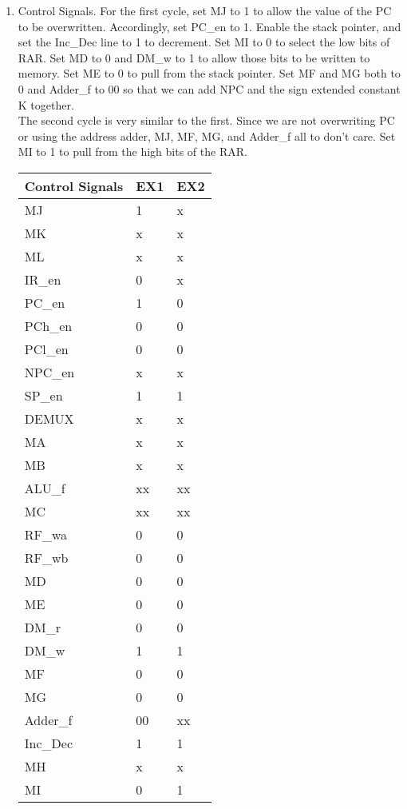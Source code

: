 \documentclass[12pt,letterpaper]{article}
\begin{document}
\begin{enumerate}
\begin{enumerate}
        \item Control Signals. For the first cycle, set MJ to 1 to allow the value of the PC to be overwritten. Accordingly, set PC\_en to 1. Enable the stack pointer, and set the Inc\_Dec line to 1 to decrement. Set MI to 0 to select the low bits of RAR. Set MD to 0 and DM\_w to 1 to allow those bits to be written to memory. Set ME to 0 to pull from the stack pointer. Set MF and MG both to 0 and Adder\_f to 00 so that we can add NPC and the sign extended constant K together.\\
        The second cycle is very similar to the first. Since we are not overwriting PC or using the address adder, MJ, MF, MG, and Adder\_f all to don't care. Set MI to 1 to pull from the high bits of the RAR.\\
            \begin{tabular}{l l l}
                 Control Signals & EX1 & EX2 \\
                 \hline
                 MJ & 1 & x \\
                 MK & x & x \\
                 ML & x & x \\
                 IR\_en & 0 & x \\
                 PC\_en & 1 & 0 \\
                 PCh\_en & 0 & 0 \\
                 PCl\_en & 0 & 0 \\
                 NPC\_en & x & x \\
                 SP\_en & 1 & 1 \\
                 DEMUX & x & x \\
                 MA & x & x \\
                 MB & x & x \\
                 ALU\_f & xx & xx \\
                 MC & xx & xx \\
                 RF\_wa & 0 & 0 \\
                 RF\_wb & 0 & 0 \\
                 MD & 0 & 0 \\
                 ME & 0 & 0 \\
                 DM\_r & 0 & 0 \\
                 DM\_w & 1 & 1 \\
                 MF & 0 & 0 \\
                 MG & 0 & 0 \\
                 Adder\_f & 00 & xx \\
                 Inc\_Dec & 1 & 1 \\
                 MH & x & x \\
                 MI & 0 & 1 \\
            \end{tabular}


\end{enumerate}
\end{enumerate}
\end{document}
